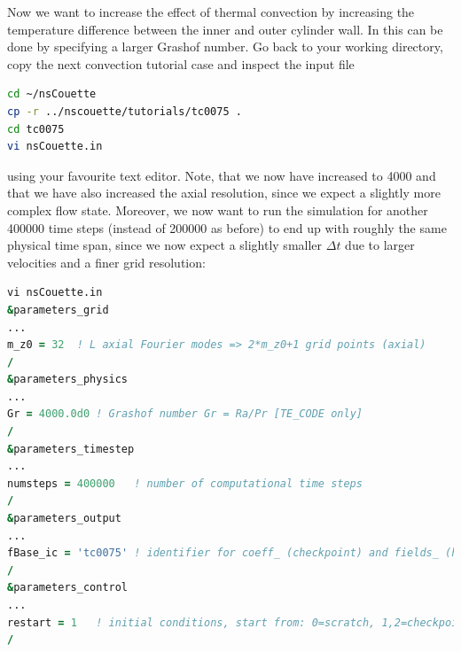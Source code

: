 \documentclass[a4paper, 11pt, DIV=11]{scrartcl}
\begin{document}
Now we want to increase the effect of thermal convection by increasing the
temperature difference between the inner and outer cylinder wall. In \nsc
this can be done by specifying a larger Grashof number. Go back to your working
directory, copy the next convection tutorial case and inspect the input file
\begin{lstlisting}[language=bash]
cd ~/nsCouette
cp -r ../nscouette/tutorials/tc0075 .
cd tc0075
vi nsCouette.in
\end{lstlisting}
using your favourite text editor. Note, that we now have increased \Gr to \num{4000}
and that we have also increased the axial resolution, since we expect a slightly more
complex flow state. Moreover, we now want to run the simulation for another
\num{400000} time steps (instead of \num{200000} as before) to end up with roughly
the same physical time span, since we now expect a slightly smaller $\Delta t$ due to
larger velocities and a finer grid resolution:
\begin{lstlisting}[language=fortran]
vi nsCouette.in
&parameters_grid
...
m_z0 = 32  ! L axial Fourier modes => 2*m_z0+1 grid points (axial)
/
&parameters_physics
...
Gr = 4000.0d0 ! Grashof number Gr = Ra/Pr [TE_CODE only]
/
&parameters_timestep
...
numsteps = 400000   ! number of computational time steps
/
&parameters_output
...
fBase_ic = 'tc0075' ! identifier for coeff_ (checkpoint) and fields_ (hdf5) files
/
&parameters_control
...
restart = 1   ! initial conditions, start from: 0=scratch, 1,2=checkpoint
/  
\end{lstlisting}
\end{document}
